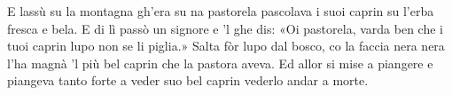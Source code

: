\beginverse
E lassù su la montagna
gh'era su na pastorela
pascolava i suoi caprin
su l'erba fresca e bela.
\endverse
\beginverse
E di lì passò un signore
e 'l ghe dis: «Oi pastorela,
varda ben che i tuoi caprin
lupo non se li piglia.»
\endverse
\beginverse
Salta fòr lupo dal bosco,
co la faccia nera nera
l'ha magnà 'l più bel caprin
che la pastora aveva.
\endverse
\beginverse
Ed allor si mise a piangere
e piangeva tanto forte
a veder suo bel caprin
vederlo andar a morte.
\endverse
\endsong
